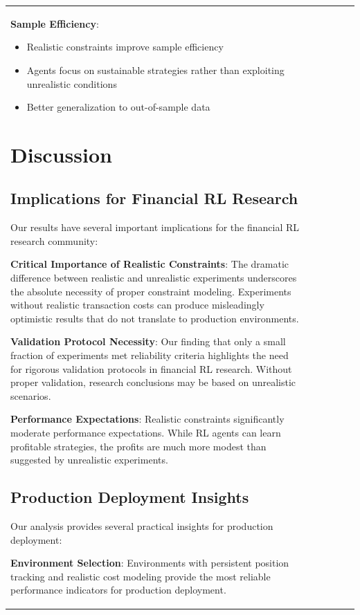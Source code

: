 \documentclass[11pt,a4paper]{article}
\begin{document}
\begin{table}[h]
\begin{tabular}{|l|c|c|c|c|c|}
\textbf{Sample Efficiency}:
\begin{itemize}
\item Realistic constraints improve sample efficiency
\item Agents focus on sustainable strategies rather than exploiting unrealistic conditions
\item Better generalization to out-of-sample data
\end{itemize}
\n\n
\section{Discussion}
\label{sec:discussion}

\subsection{Implications for Financial RL Research}

Our results have several important implications for the financial RL research community:

\textbf{Critical Importance of Realistic Constraints}: The dramatic difference between realistic and unrealistic experiments underscores the absolute necessity of proper constraint modeling. Experiments without realistic transaction costs can produce misleadingly optimistic results that do not translate to production environments.

\textbf{Validation Protocol Necessity}: Our finding that only a small fraction of experiments met reliability criteria highlights the need for rigorous validation protocols in financial RL research. Without proper validation, research conclusions may be based on unrealistic scenarios.

\textbf{Performance Expectations}: Realistic constraints significantly moderate performance expectations. While RL agents can learn profitable strategies, the profits are much more modest than suggested by unrealistic experiments.

\subsection{Production Deployment Insights}

Our analysis provides several practical insights for production deployment:

\textbf{Environment Selection}: Environments with persistent position tracking and realistic cost modeling provide the most reliable performance indicators for production deployment.


\end{tabular}
\end{table}
\end{document}
